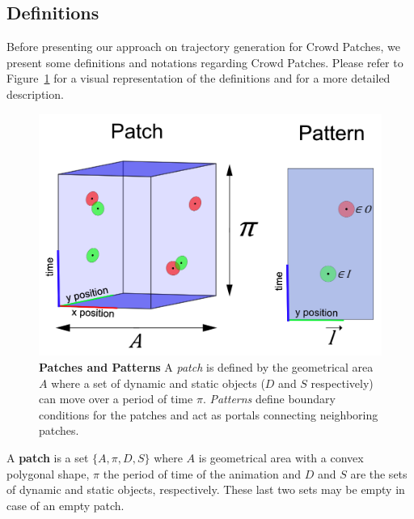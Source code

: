 \subsection{Definitions}
\label{sec:method:definitions}

Before presenting our approach on trajectory generation for Crowd Patches, we present some definitions and notations regarding Crowd Patches.
Please refer to Figure~\ref{fig:definitions} for a visual representation of the definitions and \cite{Yersin:2009} for a more detailed description.

\begin{figure}
\begin{center}
	\includegraphics[width=0.9\linewidth]{./images/patch-definitions-arrows.png}
	\caption{
		\textbf{Patches and Patterns} A \emph{patch} is defined by the geometrical area $A$ where a set of dynamic and static objects ($D$ and $S$ respectively) can move over a period of time $\pi$. \emph{Patterns} define boundary conditions for the patches and act as portals connecting neighboring patches. 
	}
	\label{fig:definitions}
	\end{center}
\end{figure}
 

A \textbf{patch} is a set $\{ A, \pi, D, S\}$ where $A$ is geometrical area with a convex polygonal shape, $\pi$ the period of time of the animation and $D$ and $S$ are the sets of dynamic and static objects, respectively. 
These last two sets may be empty in case of an empty patch.


